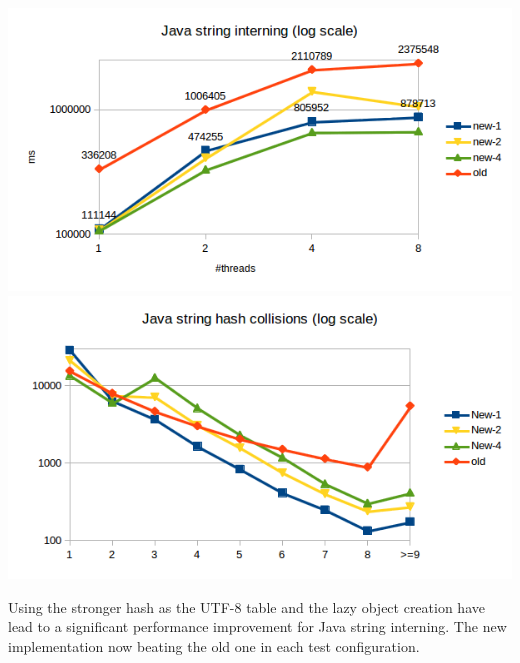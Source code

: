 \documentclass[12pt,a4paper,oneside]{article}
\begin{document}
	\includegraphics{jstr-intern-time.png}
	\includegraphics{jstr-intern-collisions.png}

	Using the stronger hash as the UTF-8 table and the lazy object creation have lead to a significant performance
	improvement for Java string interning.
	The new implementation now beating the old one in each test configuration.
\end{document}
